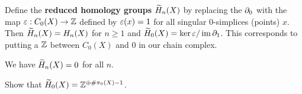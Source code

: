 \begin{defn}
  Define the \textbf{reduced homology groups} $\widetilde H_n(X)$ by replacing the $\partial_0$ with the map $\varepsilon: C_0(X) \to \mathbb{Z}$ defined by $\varepsilon(x)=1$ for all singular 0-simplices (points) $x$.
  Then $\widetilde H_n(X) = H_n(X)$ for $n \geq 1$ and $\widetilde H_0(X) = \ker\varepsilon/\operatorname{im}\partial_1$.
  This corresponds to putting a $\mathbb{Z}$ between $C_0(X)$ and $0$ in our chain complex.
\end{defn}

\begin{rmk}
  We have $\widetilde H_n(X)=0$ for all $n$.
\end{rmk}

\begin{exer}
  Show that $\widetilde H_0(X) = \mathbb{Z}^{\oplus\#\pi_0(X)-1}$.
\end{exer}
